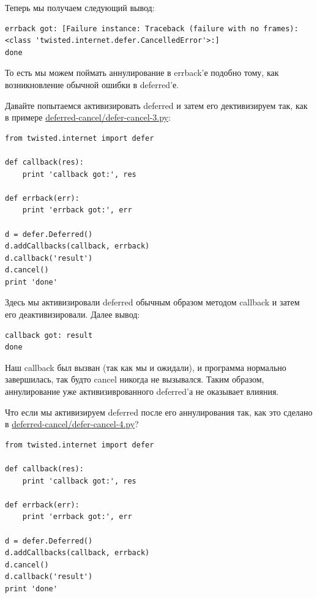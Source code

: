 Теперь мы получаем следующий вывод:

\begin{scriptsize}\begin{verbatim}
errback got: [Failure instance: Traceback (failure with no frames): 
<class 'twisted.internet.defer.CancelledError'>:]
done
\end{verbatim}\end{scriptsize}

То есть мы можем поймать аннулирование в errback'е подобно тому, как 
возникновление обычной ошибки в deferred'е.


Давайте попытаемся активизировать deferred и 
затем его дективизируем так, как в примере 
\href{http://github.com/jdavisp3/twisted-intro/blob/master/deferred-cancel/defer-cancel-3.py#L1}{deferred-cancel/defer-cancel-3.py}:


\begin{scriptsize}\begin{verbatim}
from twisted.internet import defer

def callback(res):
    print 'callback got:', res

def errback(err):
    print 'errback got:', err

d = defer.Deferred()
d.addCallbacks(callback, errback)
d.callback('result')
d.cancel()
print 'done'
\end{verbatim}\end{scriptsize}


Здесь мы активизировали deferred обычным образом 
методом callback и затем его деактивизировали. Далее вывод:

\begin{scriptsize}\begin{verbatim}
callback got: result
done
\end{verbatim}\end{scriptsize}


Наш callback был вызван (так как мы и ожидали), и 
программа нормально завершилась, так будто cancel  
никогда не вызывался. Таким образом, аннулирование уже 
активизиврованного deferred'а не оказывает влияния.


Что если мы активизируем deferred после его 
аннулирования так, как это сделано в 
\href{http://github.com/jdavisp3/twisted-intro/blob/master/deferred-cancel/defer-cancel-4.py#L1}{deferred-cancel/defer-cancel-4.py}?


\begin{scriptsize}\begin{verbatim}
from twisted.internet import defer

def callback(res):
    print 'callback got:', res

def errback(err):
    print 'errback got:', err

d = defer.Deferred()
d.addCallbacks(callback, errback)
d.cancel()
d.callback('result')
print 'done'
\end{verbatim}\end{scriptsize}

